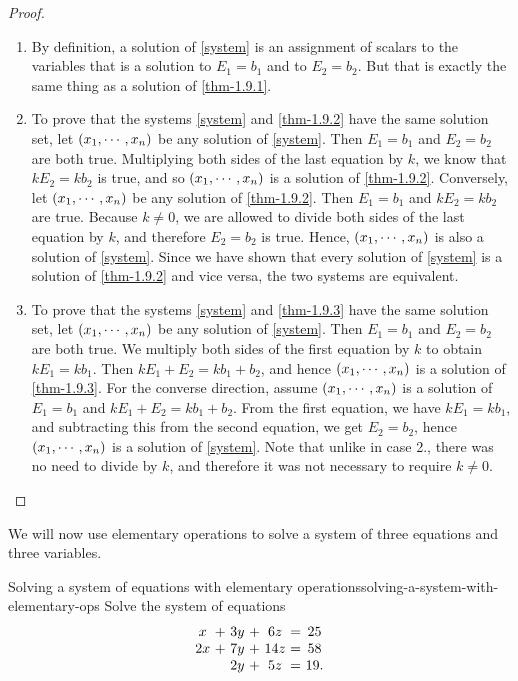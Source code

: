 \begin{proof} 
\begin{enumerate}
\item By definition, a solution of \eqref{system} is an assignment of
  scalars to the variables that is a solution to $E_1=b_1$ and to
  $E_2=b_2$. But that is exactly the same thing as a solution of
  \eqref{thm-1.9.1}.

\item To prove that the systems \eqref{system} and \eqref{thm-1.9.2}
  have the same solution set, let $\left(x_{1},\cdots,x_{n}\right)$ be
  any solution of \eqref{system}. Then $E_1=b_1$ and $E_2=b_2$ are
  both true. Multiplying both sides of the last equation by $k$, we
  know that $kE_2=kb_2$ is true, and so
  $\left(x_{1},\cdots,x_{n}\right)$ is a solution of
  \eqref{thm-1.9.2}. Conversely, let $\left(x_{1},\cdots,x_{n}\right)$
  be any solution of \eqref{thm-1.9.2}.  Then $E_1=b_1$ and $kE_2=kb_2$
  are true. Because $k\neq 0$, we are allowed to divide both sides of
  the last equation by $k$, and therefore $E_2=b_2$ is true. Hence,
  $\left(x_{1},\cdots,x_{n}\right)$ is also a solution of
  \eqref{system}. Since we have shown that every solution of
  \eqref{system}  is a solution of \eqref{thm-1.9.2} and vice versa,
  the two systems are equivalent.

\item To prove that the systems \eqref{system} and \eqref{thm-1.9.3}
  have the same solution set, let $\left(x_{1},\cdots,x_{n}\right)$ be
  any solution of \eqref{system}. Then $E_1=b_1$ and $E_2=b_2$ are
  both true. We multiply both sides of the first equation by $k$ to
  obtain $kE_1=kb_1$. Then $kE_1+E_2 = kb_1+b_2$, and hence
  $\left(x_{1},\cdots,x_{n}\right)$ is a solution of
  \eqref{thm-1.9.3}. For the converse direction, assume
  $\left(x_{1},\cdots,x_{n}\right)$ is a solution of $E_1=b_1$ and
  $kE_1+E_2 = kb_1+b_2$. From the first equation, we have $kE_1=kb_1$,
  and subtracting this from the second equation, we get $E_2=b_2$,
  hence $\left(x_{1},\cdots,x_{n}\right)$ is a solution of
  \eqref{system}. Note that unlike in case 2., there was no need to
  divide by $k$, and therefore it was not necessary to require $k\neq 0$.
\end{enumerate}
\end{proof}

We will now use elementary operations to solve a system of three
equations and three variables.

\begin{example}{Solving a system of equations with elementary operations}{solving-a-system-with-elementary-ops}
Solve the system of equations
\begin{equation*}
\begin{array}{c@{~}c@{~}c@{~}c@{~}c@{~}c@{~}c}
x&+&3y&+&6z&=&25 \\
2x&+&7y&+&14z&=&58 \\
&&2y&+&5z&=&19.
\end{array}
\label{solving-a-system1}
\end{equation*}
\end{example}


